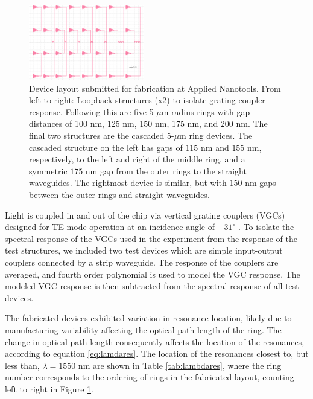 \documentclass[letterpaper, 10 pt, conference]{ieeeconf}
\begin{document}
\begin{figure}[!ht]
    \centering
    \includegraphics[width = 0.45\textwidth]{layout.png}
    \caption{Device layout submitted for fabrication at Applied Nanotools. From left to right: Loopback structures (x2) to isolate grating coupler response. Following this are five 5-$\mu$m radius rings with gap distances of 100 nm, 125 nm, 150 nm, 175 nm, and 200 nm. The final two structures are the cascaded 5-$\mu$m ring devices. The cascaded structure on the left has gaps of $115$ nm and $155$ nm, respectively, to the left and right of the middle ring, and a symmetric $175$ nm gap from the outer rings to the straight waveguides. The rightmost device is similar, but with $150$ nm gaps between the outer rings and straight waveguides.}
    \label{fig:layout}
\end{figure} 

Light is coupled in and out of the chip via vertical grating couplers (VGCs) designed for TE mode operation at an incidence angle of $-31^\circ$ \cite{VGC}. To isolate the spectral response of the VGCs used in the experiment from the response of the test structures, we included two test devices which are simple input-output couplers connected by a strip waveguide. The response of the couplers are averaged, and fourth order polynomial is used to model the VGC response. The modeled VGC response is then subtracted from the spectral response of all test devices. 

\pagebreak
The fabricated devices exhibited variation in resonance location, likely due to manufacturing variability affecting the optical path length of the ring. The change in optical path length  consequently affects the location of the resonances, according to equation \eqref{eq:lamdares}. The location of the resonances closest to, but less than, $\lambda = 1550$ nm are shown in Table \ref{tab:lambdares}, where the ring number corresponds to the ordering of rings in the fabricated layout, counting left to right in Figure \ref{fig:layout}.
\end{document}
